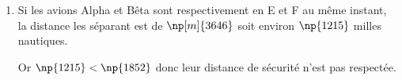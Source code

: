 \begin{enumerate}
\begin{enumerate}
$\begin{aligned} \mathrm{EF} & =\sqrt{\left(x_\mathrm{F}-x_\mathrm{E}\right)^2+\left(y_\mathrm{F}-y_\mathrm{E}\right)^2+\left(z_\mathrm{F}-z_\mathrm{E}\right)^2}\\
\mathrm{EF} &=\sqrt{\left(-1-(-3)\right)^2+\left(-3-(-1)\right)^2+\left(3-1\right)^2}\\
	\mathrm{EF}& =\sqrt{\left(2\right)^2+\left(-2\right)^2+\left(2\right)^2}\\
	\mathrm{EF}&=\sqrt{4+4+4}\\
	\mathrm{EF}&= \sqrt{12}=2\sqrt{3}
\end{aligned}$

d'où EF$\approx \np[km]{3,4641}$ soit EF$\approx \np[m]{3646}$ à 1~m près.
	\end{enumerate}
	\item Si les avions Alpha et Bêta sont respectivement en E et F au même instant, la distance les séparant est de $\np[m]{3646}$ soit environ $\np{1215}$ milles nautiques.

Or $\np{1215}<\np{1852}$ donc leur distance de sécurité n'est pas respectée.
\end{enumerate}
